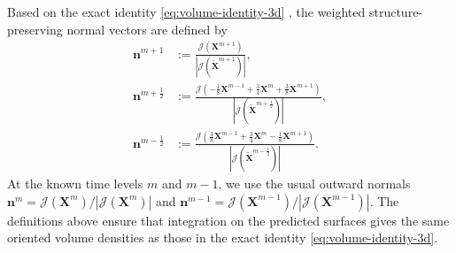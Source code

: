 \documentclass[smallextended]{svjour3}
\numberwithin{equation}{section}
\begin{document}
	Based on the exact identity \eqref{eq:volume-identity-3d} , the weighted structure-preserving normal vectors are defined by
	\begin{align}
		\mathbf{n}^{m+1}
		&:=
		\frac{\mathcal{J}(\mathbf{X}^{m+1})}
		{|\mathcal{J}(\widetilde{\mathbf{X}}^{m+1})|},
		\label{eq:n-mplus-3d}
		\\
		\mathbf{n}^{m+\frac12}
		&:=
		\frac{\mathcal{J}\left(-\frac18\mathbf{X}^{m-1}+\frac34\mathbf{X}^{m}+\frac38\mathbf{X}^{m+1}\right)}
		{|\mathcal{J}(\widetilde{\mathbf{X}}^{m+\frac12})|},
		\label{eq:n-phalf-3d}
		\\
		\mathbf{n}^{m-\frac12}
		&:=
		\frac{\mathcal{J}\left(\frac38\mathbf{X}^{m-1}+\frac34\mathbf{X}^{m}-\frac18\mathbf{X}^{m+1}\right)}
		{|\mathcal{J}(\widetilde{\mathbf{X}}^{m-\frac12})|}.
		\label{eq:n-mhalf-3d}
	\end{align}
	At the known time levels $m$ and $m-1$, we use the usual outward normals $\mathbf{n}^{m}=\mathcal{J}(\mathbf{X}^{m})/|\mathcal{J}(\mathbf{X}^{m})|$ and $\mathbf{n}^{m-1}=\mathcal{J}(\mathbf{X}^{m-1})/|\mathcal{J}(\mathbf{X}^{m-1})|$. The definitions above ensure that integration on the predicted surfaces gives the same oriented volume densities as those in the exact identity \eqref{eq:volume-identity-3d}.
	
\end{document}
